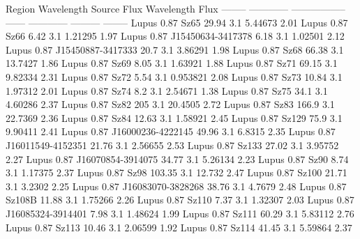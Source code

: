 Region      Wavelength  Source               Flux    Wavelength       Flux    \alpha
--------  ------------  -----------------  ------  ------------  ---------  --------
Lupus             0.87  Sz65                29.94          3.1    5.44673       2.01
Lupus             0.87  Sz66                 6.42          3.1    1.21295       1.97
Lupus             0.87  J15450634-3417378    6.18          3.1    1.02501       2.12
Lupus             0.87  J15450887-3417333   20.7           3.1    3.86291       1.98
Lupus             0.87  Sz68                66.38          3.1   13.7427        1.86
Lupus             0.87  Sz69                 8.05          3.1    1.63921       1.88
Lupus             0.87  Sz71                69.15          3.1    9.82334       2.31
Lupus             0.87  Sz72                 5.54          3.1    0.953821      2.08
Lupus             0.87  Sz73                10.84          3.1    1.97312       2.01
Lupus             0.87  Sz74                 8.2           3.1    2.54671       1.38
Lupus             0.87  Sz75                34.1           3.1    4.60286       2.37
Lupus             0.87  Sz82               205             3.1   20.4505        2.72
Lupus             0.87  Sz83               166.9           3.1   22.7369        2.36
Lupus             0.87  Sz84                12.63          3.1    1.58921       2.45
Lupus             0.87  Sz129               75.9           3.1    9.90411       2.41
Lupus             0.87  J16000236-4222145   49.96          3.1    6.8315        2.35
Lupus             0.87  J16011549-4152351   21.76          3.1    2.56655       2.53
Lupus             0.87  Sz133               27.02          3.1    3.95752       2.27
Lupus             0.87  J16070854-3914075   34.77          3.1    5.26134       2.23
Lupus             0.87  Sz90                 8.74          3.1    1.17375       2.37
Lupus             0.87  Sz98               103.35          3.1   12.732         2.47
Lupus             0.87  Sz100               21.71          3.1    3.2302        2.25
Lupus             0.87  J16083070-3828268   38.76          3.1    4.7679        2.48
Lupus             0.87  Sz108B              11.88          3.1    1.75266       2.26
Lupus             0.87  Sz110                7.37          3.1    1.32307       2.03
Lupus             0.87  J16085324-3914401    7.98          3.1    1.48624       1.99
Lupus             0.87  Sz111               60.29          3.1    5.83112       2.76
Lupus             0.87  Sz113               10.46          3.1    2.06599       1.92
Lupus             0.87  Sz114               41.45          3.1    5.59864       2.37

